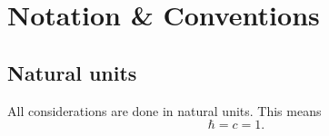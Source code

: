 

\chapter{Notation \& Conventions}

\section{Natural units}
All considerations are done in natural units. This means
\begin{equation}
  \label{eq:natural-units}
  \hbar = c = 1.
\end{equation}

